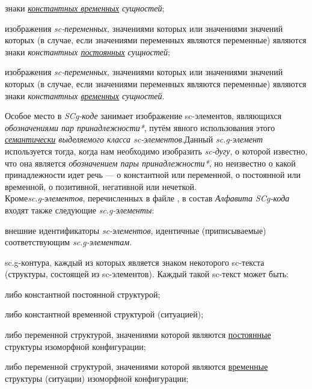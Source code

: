 \begin{SCn}
\begin{scnstruct}
\begin{scnsubstruct}
{\begin{scnitemize}
                    \item знаки \textit{\uline{константных временных} сущностей};
                    \item изображения \textit{sc-переменных}, значениями которых или значениями значений которых (в случае, если значениями переменных являются переменные) являются знаки \textit{константных \uline{постоянных} сущностей};
                    \item изображения \textit{sc-переменных}, значениями которых или значениями значений которых (в случае, если значениями переменных являются переменные) являются знаки \textit{константных \uline{временных} сущностей}.
                \end{scnitemize}
                Особое место в \textit{SCg-коде} занимает изображение sc-элементов, являющихся \textit{обозначениями пар принадлежности*}, путём явного использования этого \textit{\uline{семантически} выделяемого класса sc-элементов}.Данный \textit{sc.g-элемент} используется тогда, когда нам необходимо изобразить \textit{sc-дугу}, о которой известно, что она является \textit{обозначением пары принадлежности*}, но неизвестно о какой принадлежности идет речь --- о константной или переменной, о постоянной или временной, о позитивной, негативной или нечеткой.
                \\Кроме\textit{sc.g-элементов}, перечисленных в файле , в состав \textit{Алфавита SCg-кода} входят также следующие \textit{sc.g-элементы}:
                \begin{scnitemize}
                    \item внешние идентификаторы \textit{sc-элементов}, идентичные (приписываемые) соответствующим \textit{sc.g-элементам}. 
                    \item sc.g-контура, каждый из которых является знаком некоторого sc-текста (структуры, состоящей из sc-элементов). Каждый такой sc-текст может быть:
                        \begin{scnitemizeii}
                            \item либо константной постоянной структурой;
                            \item либо константной временной структурой (ситуацией);
                            \item либо переменной структурой, значениями которой являются \uline{постоянные} структуры изоморфной  конфигурации;
                            \item либо переменной структурой, значениями которой являются \uline{временные} структуры (ситуации) изоморфной  конфигурации;

\end{scnitemizeii}
\end{scnitemize}}
\end{scnsubstruct}
\end{scnstruct}
\end{SCn}
